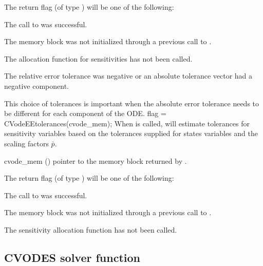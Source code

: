 {
  The return flag  (of type ) will be one of the following:
  \begin{args}
  \item[\Id{CV\_SUCCESS}]
    The call to  was successful.
  \item[\Id{CV\_MEM\_NULL}] 
    The {\cvodes} memory block was not initialized through a previous call to
    .
  \item[\Id{CV\_NO\_SENS}] 
    The allocation function for sensitivities has not been called.
  \item[\Id{CV\_ILL\_INPUT}] 
    The relative error tolerance was negative or an absolute tolerance vector
    had a negative component.
  \end{args}
}
{
  This choice of tolerances is important when the absolute error tolerance needs to
  be different for each component of the ODE. 
}
{
  flag = CVodeEEtolerances(cvode\_mem);
}
{
  When  is called, {\cvodes} will estimate tolerances for
  sensitivity variables based on the tolerances supplied for states variables
  and the scaling factors $\bar p$.
}
{
  \begin{args}
  \item[cvode\_mem] ()
    pointer to the {\cvodes} memory block returned by .
  \end{args}
}
{
  The return flag  (of type ) will be one of the following:
  \begin{args}
  \item[\Id{CV\_SUCCESS}]
    The call to  was successful.
  \item[\Id{CV\_MEM\_NULL}] 
    The {\cvodes} memory block was not initialized through a previous call to
    .
  \item[\Id{CV\_NO\_SENS}] 
    The sensitivity allocation function has not been called.
  \end{args}
}
{}
\subsection{CVODES solver function}

